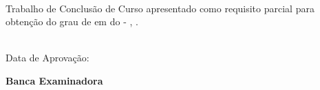 %
%

\makeatletter
\begin{folhadeaprovacao}

\thispagestyle{empty}%
	
	\begin{center}
    
		\small\textbf{\expandafter\uppercase\expandafter{\imprimirnomeautor}}\\
		\vspace*{3.0 cm}%
		\normalsize\textbf{\expandafter\uppercase\expandafter{\imprimirtitulotb}}
		
    \end{center}
	
	\vspace*{0.35 cm}%
		    \large%
    		\hfill%
	    	\begin{minipage}{8 cm}%
	    		\begin{small} %
	    		\setlength{\baselineskip}{0.7\baselineskip}
				
		    	{Trabalho de Conclusão de Curso apresentado como requisito parcial para obtenção do grau de
		    	{\imprimirgrau } em {\imprimirprograma } do {\imprimirinstituicao}{ - }{\imprimirabreviatura},
		    	{\imprimirdepartamento}.}\\{
		    	}\\				
				
				\end{small} %
		    \end{minipage}%
		    	
		    \vspace*{0.6 cm}%
		    
		    \large%
    		\hfill%
	    	 
		    
		    \normalsize %
		    \vspace*{1.5 cm}%
		    
		    \begin{minipage}{9 cm }%
		    {Data de Aprovação: {\imprimirdataapresentacao}}\\
		    \end{minipage}%
			
			\begin{center}%
		    	\vspace*{1.21 cm}%
				\textbf{Banca Examinadora}\\ %
						

\end{center}
\end{folhadeaprovacao}
